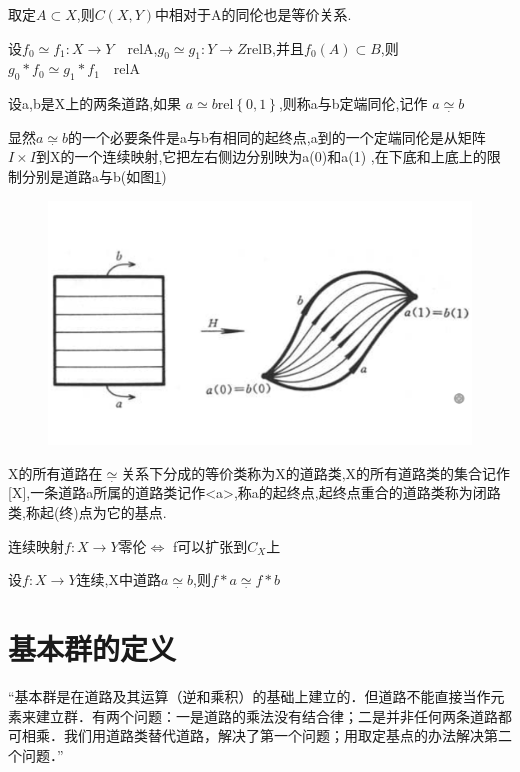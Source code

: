 \begin{corollary}
    取定\(A \subset X\),则\(C(X,Y)\)中相对于A的同伦也是等价关系.
\end{corollary}
\begin{corollary}
    设\(f_0 \simeq f_1: X \rightarrow Y \quad \text{relA}\),\(g_0 \simeq g_1 : Y \rightarrow Z \text{relB}\),并且\(f_0(A) \subset B\),则\(g_0 *f_0 \simeq g_1 *f_1 \quad \text{relA}\)
\end{corollary}
\begin{definition}
    设a,b是X上的两条道路,如果 \(a \simeq b \text{rel} \left\{0,1\right\}\),则称a与b定端同伦,记作 \(a \underset{.}{\simeq} b  \)
\end{definition}
显然\(a \underset{.}{\simeq} b\)的一个必要条件是a与b有相同的起终点,a到的一个定端同伦是从矩阵\(I \times I \)到X的一个连续映射,它把左右侧边分别映为a(0)和a(1) ,在下底和上底上的限制分别是道路a与b(如图\ref{fig:enter-label_20})
\begin{figure}[H]
    \centering
    \includegraphics[width=0.3\linewidth]{image_20.png}
    \caption{}
    \label{fig:enter-label_20}
\end{figure}
X的所有道路在\(\underset{.}{\simeq}\)关系下分成的等价类称为X的道路类,X的所有道路类的集合记作[X],一条道路a所属的道路类记作<a>,称a的起终点,起终点重合的道路类称为闭路类,称起(终)点为它的基点.
\begin{theorem}
    连续映射\(f: X \rightarrow Y \)零伦\(\Leftrightarrow\) f可以扩张到\(C_X\)上
\end{theorem}
\begin{theorem}
    设\(f:X \rightarrow Y\)连续,X中道路\(a \underset{.}{\simeq} b\),则\(f*a \underset{.}{\simeq} f *b\)
\end{theorem}
\section{基本群的定义}
“基本群是在道路及其运算（逆和乘积）的基础上建立的．但道路不能直接当作元素来建立群．有两个问题：一是道路的乘法没有结合律；二是并非任何两条道路都可相乘．我们用道路类替代道路，解决了第一个问题；用取定基点的办法解决第二个问题．”
